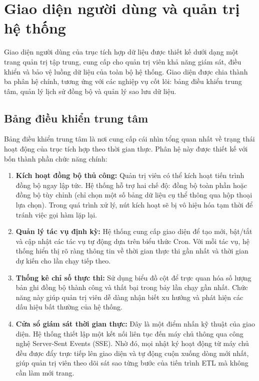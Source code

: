 \newpage
\section{Giao diện người dùng và quản trị hệ thống}

Giao diện người dùng của trục tích hợp dữ liệu được thiết kế dưới dạng một trang quản trị tập trung, cung cấp cho quản trị viên khả năng giám sát, điều khiển và bảo vệ luồng dữ liệu của toàn bộ hệ thống. Giao diện được chia thành ba phân hệ chính, tương ứng với các nghiệp vụ cốt lõi: bảng điều khiển trung tâm, quản lý lịch sử đồng bộ và quản lý sao lưu dữ liệu.

\subsection{Bảng điều khiển trung tâm}

Bảng điều khiển trung tâm là nơi cung cấp cái nhìn tổng quan nhất về trạng thái hoạt động của trục tích hợp theo thời gian thực. Phân hệ này được thiết kế với bốn thành phần chức năng chính:

\begin{enumerate}
    \item \textbf{Kích hoạt đồng bộ thủ công:} Quản trị viên có thể kích hoạt tiến trình đồng bộ ngay lập tức. Hệ thống hỗ trợ hai chế độ: đồng bộ toàn phần hoặc đồng bộ tùy chỉnh (chỉ chọn một số bảng dữ liệu cụ thể thông qua hộp thoại lựa chọn). Trong quá trình xử lý, nút kích hoạt sẽ bị vô hiệu hóa tạm thời để tránh việc gọi hàm lặp lại.
    
    \item \textbf{Quản lý tác vụ định kỳ:} Hệ thống cung cấp giao diện để tạo mới, bật/tắt và cập nhật các tác vụ tự động dựa trên biểu thức Cron. Với mỗi tác vụ, hệ thống hiển thị rõ ràng thông tin về thời gian thực thi gần nhất và thời gian dự kiến cho lần chạy tiếp theo.
    
    \item \textbf{Thống kê chỉ số thực thi:} Sử dụng biểu đồ cột để trực quan hóa số lượng bản ghi đồng bộ thành công và thất bại trong bảy lần chạy gần nhất. Chức năng này giúp quản trị viên dễ dàng nhận biết xu hướng và phát hiện các dấu hiệu bất thường của hệ thống.
    
    \item \textbf{Cửa sổ giám sát thời gian thực:} Đây là một điểm nhấn kỹ thuật của giao diện. Hệ thống thiết lập một kết nối liên tục đến máy chủ thông qua công nghệ Server-Sent Events (SSE). Nhờ đó, mọi nhật ký hoạt động từ máy chủ đều được đẩy trực tiếp lên giao diện và tự động cuộn xuống dòng mới nhất, giúp quản trị viên theo dõi sát sao từng bước của tiến trình ETL mà không cần làm mới trang.
\end{enumerate}

